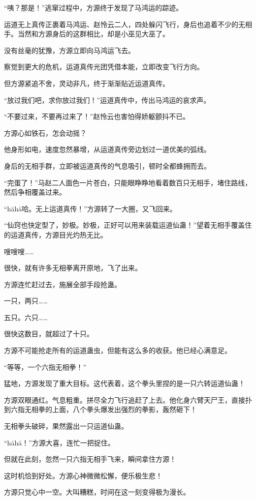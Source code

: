 \begin{this_body}
“咦？那是！”逃窜过程中，方源终于发现了马鸿运的踪迹。

运道无上真传正裹着马鸿运、赵怜云二人，四处躲闪飞行，身后也追着不少的无相手。当然和方源身后的这群相比，却是小巫见大巫了。

没有丝毫的犹豫，方源立即向马鸿运飞去。

察觉到更大的危机，运道真传光团凭借本能，立即改变飞行方向。

但方源紧追不舍，灵动非凡，终于渐渐贴近运道真传。

“放过我们吧，求你放过我们！”运道真传中，传出马鸿运的哀求声。

“不要过来，不要再过来了！”赵怜云也害怕得娇躯颤抖不已。

方源心如铁石，怎会动摇？

他身形如电，速度忽然暴增，从运道真传旁边划过一道优美的弧线。

身后的无相手群，立即被运道真传的气息吸引，顿时全都蜂拥而去。

“完蛋了！”马赵二人面色一片苍白，只能眼睁睁地看着数百只无相手，堵住路线，然后争相覆盖过来。

“hāhā哈。无上运道真传！”方源转了一大圈，又飞回来。

“仙窍也快定型了，妙极。妙极，正好可以用来装载运道仙蛊！”望着无相手覆盖住的运道真传，方源目光灼热无比。

嗖嗖嗖……

很快，就有许多无相拳离开原地，飞了出来。

方源连忙赶过去，施展全部手段抢蛊。

一只，两只……

五只。六只……

很快这数目，就超过了十只。

方源不可能抢走所有的运道蛊虫，但能有这么多的收获。他已经心满意足。

“等等，一个六指无相拳！”

猛地，方源发现了重大目标。这代表着，这个拳头里捏的是一只六转运道仙蛊！

方源双眼通红。气息粗重。拼尽全力飞行追赶了上去。他化身六臂天尸王，直接扑到六指无相拳的上面，八个拳头爆发出强烈的拳影，轰然砸下！

无相拳头破碎，果然露出一只运道仙蛊。

“hāhā！”方源大喜，连忙一把捉住。

但就在此刻，忽然一只六指无相手飞来，瞬间拿住方源！

这时机恰到好处。方源心神微微松懈，便乐极生悲！

方源只觉心中一空。大叫糟糕，时间在这一刻变得极为漫长。


\end{this_body}
